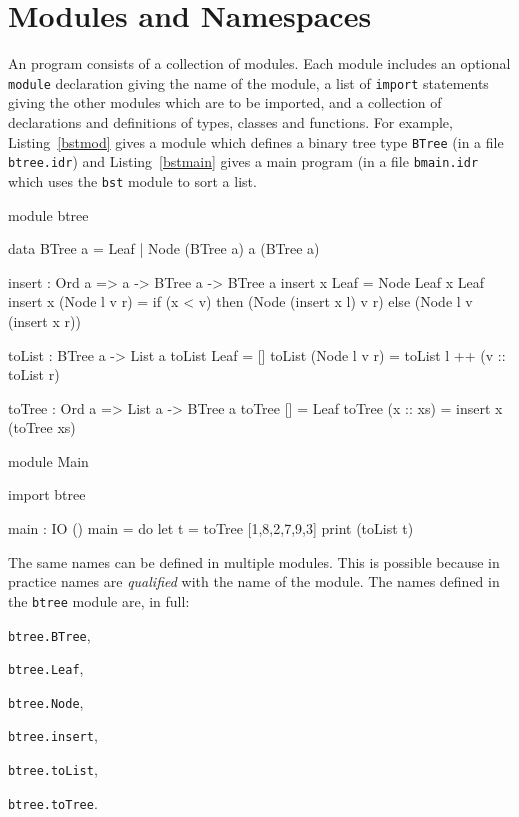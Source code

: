 \section{Modules and Namespaces}
\label{sect:namespaces}

An \Idris{} program consists of a collection of modules.
Each module includes an optional \texttt{module} declaration giving the name of the module, a list of \texttt{import} statements giving the other modules which are to be imported, and a collection of declarations and definitions of types, classes and functions.
For example, Listing~\ref{bstmod} gives a module which defines a binary tree type \texttt{BTree} (in a file \texttt{btree.idr}) and Listing~\ref{bstmain} gives a main program (in a file \texttt{bmain.idr} which uses the \texttt{bst} module to sort a list.

\begin{code}[caption={Binary Tree module}, label=bstmod]
module btree

data BTree a = Leaf
             | Node (BTree a) a (BTree a)

insert : Ord a => a -> BTree a -> BTree a
insert x Leaf = Node Leaf x Leaf
insert x (Node l v r) = if (x < v) then (Node (insert x l) v r)
                                   else (Node l v (insert x r))

toList : BTree a -> List a
toList Leaf = []
toList (Node l v r) = toList l ++ (v :: toList r)

toTree : Ord a => List a -> BTree a
toTree [] = Leaf
toTree (x :: xs) = insert x (toTree xs)
\end{code}

\begin{code}[caption={Binary Tree main program},label=bstmain]
module Main

import btree

main : IO ()
main = do let t = toTree [1,8,2,7,9,3] 
          print (toList t)
\end{code}

\noindent
The same names can be defined in multiple modules.
This is possible because in practice names are \emph{qualified} with the name of the module. 
The names defined in the \texttt{btree} module are, in full:

\begin{multicols}{2}
\begin{compactitem}
\item \texttt{btree.BTree},
\item \texttt{btree.Leaf},
\item \texttt{btree.Node},
\columnbreak
\item \texttt{btree.insert},
\item \texttt{btree.toList},
\item \texttt{btree.toTree}.
\end{compactitem}
\end{multicols}

